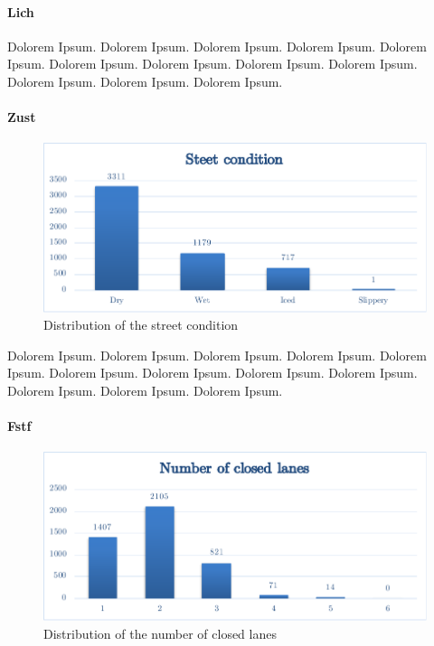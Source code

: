 \documentclass[a4paper,12pt]{report}
\begin{document}
\paragraph{Lich}
Dolorem Ipsum. Dolorem Ipsum. Dolorem Ipsum. Dolorem Ipsum.
Dolorem Ipsum. Dolorem Ipsum. Dolorem Ipsum. Dolorem Ipsum.
Dolorem Ipsum. Dolorem Ipsum. Dolorem Ipsum. Dolorem Ipsum.

\paragraph{Zust}
\begin{figure}[h]
	\centering
	\includegraphics[scale=0.6]{./assets/baysis_dataset_Zust}
	\caption{Distribution of the street condition}
	\label{img:baysis_dataset_Zust}
\end{figure}

Dolorem Ipsum. Dolorem Ipsum. Dolorem Ipsum. Dolorem Ipsum.
Dolorem Ipsum. Dolorem Ipsum. Dolorem Ipsum. Dolorem Ipsum.
Dolorem Ipsum. Dolorem Ipsum. Dolorem Ipsum. Dolorem Ipsum.

\paragraph{Fstf}
\begin{figure}[H]
	\centering
	\includegraphics[scale=0.6]{./assets/baysis_dataset_Fstf.pdf}
	\caption{Distribution of the number of closed lanes}
	\label{img:baysis_dataset_Fstf}
\end{figure}
\end{document}
